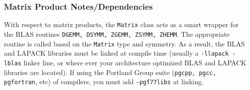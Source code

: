 \documentclass[english,journal=jctcce,manuscript=article,etalmode=truncate,maxauthors=0]{article}
\begin{document}
\subsubsection{Matrix Product Notes/Dependencies}
With respect to matrix products, the \texttt{Matrix} class acts as a smart wrapper for the BLAS routines \texttt{DGEMM, DSYMM, ZGEMM, ZSYMM, ZHEMM}. The appropriate routine is called based on the \texttt{Matrix} type and symmetry. As a result, the BLAS and LAPACK libraries must be linked at compile time (usually a \texttt{-llapack -lblas} linker line, or where ever your architecture optimized BLAS and LAPACK libraries are located). If using the Portland Group suite (\texttt{pgcpp, pgcc, pgfortran}, etc) of compilers, you must add \texttt{-pgf77libs} at linking.
\end{document}
